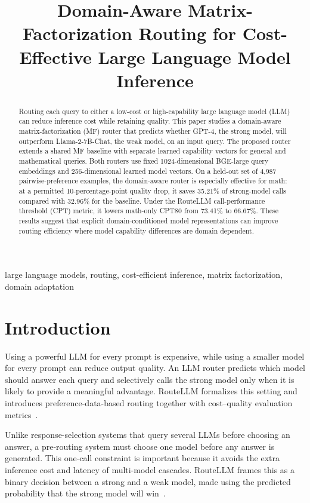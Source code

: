 \documentclass[conference]{IEEEtran}
\title{Domain-Aware Matrix-Factorization Routing for Cost-Effective Large Language Model Inference}
\author{\IEEEauthorblockN{Sourabh S Mahindrakar, Chandan R, Sreephaneesha K, Sricharan D}
\IEEEauthorblockA{Under the guidance of Dr. Ravi Gorripati\\
PES University}}
\begin{document}
\maketitle

\begin{abstract}
Routing each query to either a low-cost or high-capability large language model (LLM) can reduce inference cost while retaining quality. This paper studies a domain-aware matrix-factorization (MF) router that predicts whether GPT-4, the strong model, will outperform Llama-2-7B-Chat, the weak model, on an input query. The proposed router extends a shared MF baseline with separate learned capability vectors for general and mathematical queries. Both routers use fixed 1024-dimensional BGE-large query embeddings and 256-dimensional learned model vectors. On a held-out set of 4,987 pairwise-preference examples, the domain-aware router is especially effective for math: at a permitted 10-percentage-point quality drop, it saves 35.21\% of strong-model calls compared with 32.96\% for the baseline. Under the RouteLLM call-performance threshold (CPT) metric, it lowers math-only CPT80 from 73.41\% to 66.67\%. These results suggest that explicit domain-conditioned model representations can improve routing efficiency where model capability differences are domain dependent.
\end{abstract}

\begin{IEEEkeywords}
large language models, routing, cost-efficient inference, matrix factorization, domain adaptation
\end{IEEEkeywords}

\section{Introduction}
Using a powerful LLM for every prompt is expensive, while using a smaller model for every prompt can reduce output quality. An LLM router predicts which model should answer each query and selectively calls the strong model only when it is likely to provide a meaningful advantage. RouteLLM formalizes this setting and introduces preference-data-based routing together with cost--quality evaluation metrics~\cite{ong2024routellm}.

Unlike response-selection systems that query several LLMs before choosing an answer, a pre-routing system must choose one model before any answer is generated. This one-call constraint is important because it avoids the extra inference cost and latency of multi-model cascades. RouteLLM frames this as a binary decision between a strong and a weak model, made using the predicted probability that the strong model will win~\cite{ong2024routellm}.
\end{document}
